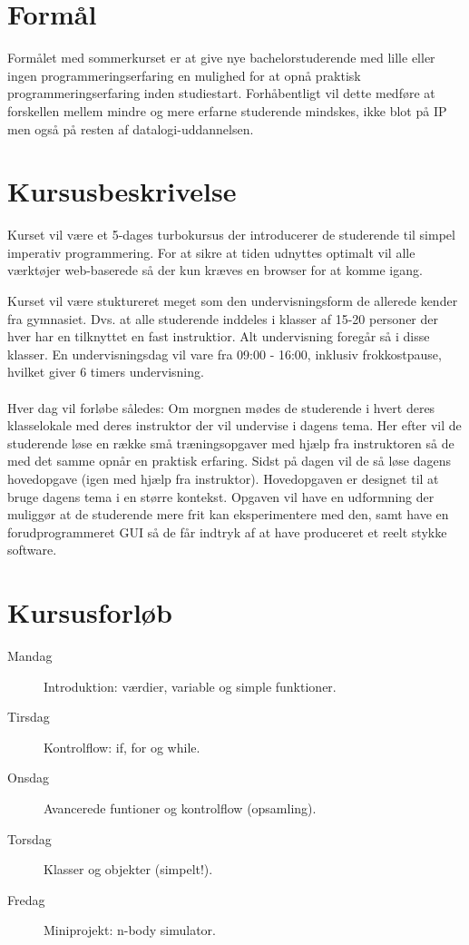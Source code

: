 \documentclass[11pt,a4paper]{article}
\begin{document}
\maketitle


\section{Formål}
Formålet med sommerkurset er at give nye bachelorstuderende med lille eller ingen
programmeringserfaring en mulighed for at opnå praktisk programmeringserfaring   
inden studiestart. Forhåbentligt vil dette medføre at forskellen mellem mindre
og mere erfarne studerende mindskes, ikke blot på IP men også på resten af 
datalogi-uddannelsen.

\section{Kursusbeskrivelse}
Kurset vil være et 5-dages turbokursus der introducerer de studerende til simpel
imperativ programmering. For at sikre at tiden udnyttes optimalt vil alle 
værktøjer web-baserede så der kun kræves en browser for at komme igang.

Kurset vil være stuktureret meget som den undervisningsform de allerede kender
fra gymnasiet. Dvs. at alle studerende inddeles i klasser af 15-20 personer der
hver har en tilknyttet en fast instruktior. Alt undervisning foregår så i disse
klasser. En undervisningsdag vil vare fra 09:00 - 16:00, inklusiv frokkostpause,
hvilket giver 6 timers undervisning.
\\\\
Hver dag vil forløbe således: Om morgnen mødes de studerende i hvert deres 
klasselokale med deres instruktor der vil undervise i dagens tema. Her efter vil 
de studerende løse en række små træningsopgaver med hjælp fra instruktoren så de
med det samme opnår en praktisk erfaring. Sidst på dagen vil de så løse dagens
hovedopgave (igen med hjælp fra instruktor). Hovedopgaven er designet til at 
bruge dagens tema i en større kontekst. Opgaven vil have en udformning der 
muliggør at de studerende mere frit kan eksperimentere med den, samt have en 
forudprogrammeret GUI så de får indtryk af at have produceret et reelt stykke 
software.

\section{Kursusforløb}
\begin{description}
  \item[Mandag] Introduktion: værdier, variable og simple funktioner.
  \item[Tirsdag] Kontrolflow: if, for og while.
  \item[Onsdag] Avancerede funtioner og kontrolflow (opsamling).
  \item[Torsdag] Klasser og objekter (simpelt!).
  \item[Fredag] Miniprojekt: n-body simulator.
\end{description}
\end{document}
